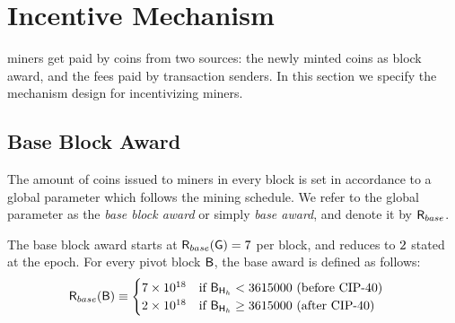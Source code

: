 
\section{Incentive Mechanism}
\label{sec:incentive}

\name miners get paid by \name coins from two sources: the newly minted \name coins as block award,
and the fees paid by transaction senders.
In this section we specify the mechanism design for incentivizing \name miners. 




\subsection{Base Block Award}
\label{subsec:baseaward}
The amount of coins issued to miners in every block is set in accordance to a global parameter which follows the mining schedule.
We refer to the global parameter as the \emph{base block award} or simply \emph{base award}, and denote it by $\textsf{R}_{base}$. 



	The base block award starts at $\textsf{R}_{base}(\textsf{G}) = 7$ \coinsign per block,
	and reduces to $2$ \coinsign stated at the \tanzaniteepoch epoch. 
	For every pivot block $\textsf{B}$, the base award is defined as follows:
	\begin{align}
		\textsf{R}_{base}(\textsf{B})&\equiv
		\begin{cases}
			7 \times 10^{18} & \mbox{if $\textsf{B}_{\textsf{H}_h}<3615000$ (before CIP-40)} \\
			2 \times 10^{18} & \mbox{if $\textsf{B}_{\textsf{H}_h}\ge 3615000$ (after CIP-40)} 
		\end{cases}
	\end{align}

